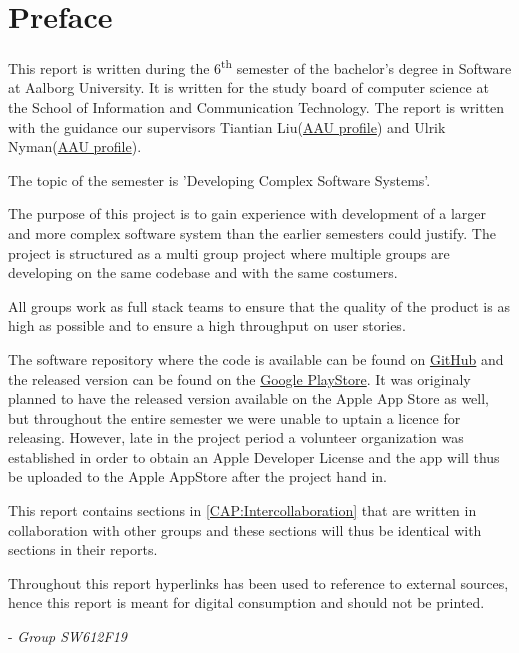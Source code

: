 \chapter*{Preface}
This report is written during the 6\textsuperscript{th} semester of the bachelor's degree in Software at Aalborg University.
It is written for the study board of computer science at the School of Information and Communication Technology.
The report is written with the guidance our supervisors Tiantian Liu(\href{http://personprofil.aau.dk/profil/145323}{AAU profile}) and Ulrik Nyman(\href{http://personprofil.aau.dk/profil/110550}{AAU profile}).

The topic of the semester is 'Developing Complex Software Systems'.

The purpose of this project is to gain experience with development of a larger and more complex software system than the earlier semesters could justify.
The project is structured as a multi group project where multiple groups are developing on the same codebase and with the same costumers.

All groups work as full stack teams to ensure that the quality of the product is as high as possible and to ensure a high throughput on user stories.

The software repository where the code is available can be found on \href{https://github.com/aau-giraf/}{GitHub} and the released version can be found on the \href{https://play.google.com/store/apps/details?id=dk.aau.cs.giraf.weekplanner}{Google PlayStore}.
It was originaly planned to have the released version available on the Apple App Store as well, but throughout the entire semester we were unable to uptain a licence for releasing.
However, late in the project period a volunteer organization was established in order to obtain an Apple Developer License and the app will thus be uploaded to the Apple AppStore after the project hand in.

This report contains sections in \autoref{CAP:Intercollaboration} that are written in collaboration with other groups and these sections will thus be identical with sections in their reports.

Throughout this report hyperlinks has been used to reference to external sources, hence this report is meant for digital consumption and should not be printed. 

- \textit{Group SW612F19}

\newpage
